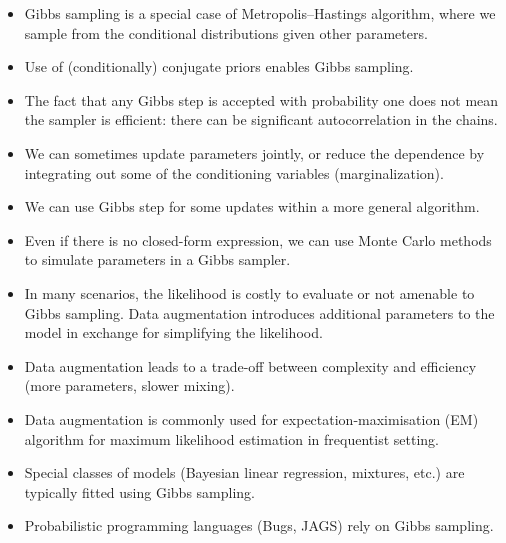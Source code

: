 \documentclass[
  11pt,
  letterpaper,
]{scrbook}
\providecommand{\tightlist}{%
  \setlength{\itemsep}{0pt}\setlength{\parskip}{0pt}}
\theoremstyle{definition}
\theoremstyle{plain}
\theoremstyle{plain}
\theoremstyle{plain}
\theoremstyle{definition}
\theoremstyle{definition}
\theoremstyle{plain}
\theoremstyle{plain}
\theoremstyle{remark}
\begin{document}
\begin{tcolorbox}[enhanced jigsaw, arc=.35mm, bottomrule=.15mm, bottomtitle=1mm, breakable, colback=white, colbacktitle=quarto-callout-important-color!10!white, colframe=quarto-callout-important-color-frame, coltitle=black, left=2mm, leftrule=.75mm, opacityback=0, opacitybacktitle=0.6, rightrule=.15mm, title=\textcolor{quarto-callout-important-color}{\faExclamation}\hspace{0.5em}{\textbf{Summary}:}, titlerule=0mm, toprule=.15mm, toptitle=1mm]

\begin{itemize}
\tightlist
\item
  Gibbs sampling is a special case of Metropolis--Hastings algorithm,
  where we sample from the conditional distributions given other
  parameters.
\item
  Use of (conditionally) conjugate priors enables Gibbs sampling.
\item
  The fact that any Gibbs step is accepted with probability one does not
  mean the sampler is efficient: there can be significant
  autocorrelation in the chains.
\item
  We can sometimes update parameters jointly, or reduce the dependence
  by integrating out some of the conditioning variables
  (marginalization).
\item
  We can use Gibbs step for some updates within a more general
  algorithm.
\item
  Even if there is no closed-form expression, we can use Monte Carlo
  methods to simulate parameters in a Gibbs sampler.
\item
  In many scenarios, the likelihood is costly to evaluate or not
  amenable to Gibbs sampling. Data augmentation introduces additional
  parameters to the model in exchange for simplifying the likelihood.
\item
  Data augmentation leads to a trade-off between complexity and
  efficiency (more parameters, slower mixing).
\item
  Data augmentation is commonly used for expectation-maximisation (EM)
  algorithm for maximum likelihood estimation in frequentist setting.
\item
  Special classes of models (Bayesian linear regression, mixtures, etc.)
  are typically fitted using Gibbs sampling.
\item
  Probabilistic programming languages (Bugs, JAGS) rely on Gibbs
  sampling.
\end{itemize}

\end{tcolorbox}
\end{document}
